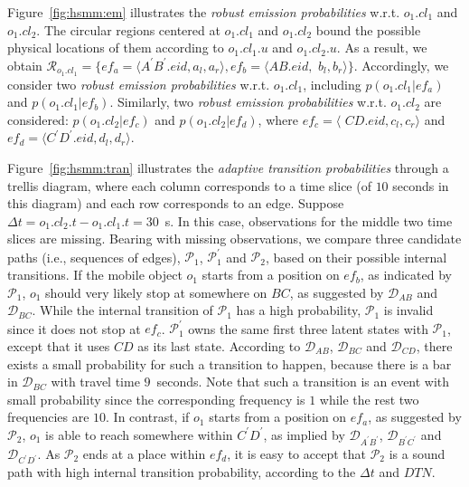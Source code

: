 \documentclass{vldb}
\begin{document}
	Figure~\ref{fig:hsmm:em} illustrates the {\em robust emission probabilities} w.r.t. $o_1.cl_1$ and $o_1.cl_2$.
	The circular regions centered at $o_1.cl_1$ and $o_1.cl_2$ bound the possible physical locations of them according to $o_1.cl_1.u$ and $o_1.cl_2.u$.
	As a result, we obtain $\mathcal{R}_{o_1.cl_1}=\{ef_a=\langle A^\prime B^\prime.eid, a_l, a_r \rangle, ef_b=\langle AB.eid,$ $b_l, b_r \rangle \}$.
	Accordingly, we consider two {\em robust emission probabilities} w.r.t. $o_1.cl_1$, including $p(o_1.cl_1|ef_a)$ and $p(o_1.cl_1|ef_b)$.
	Similarly, two {\em robust emission probabilities} w.r.t. $o_1.cl_2$ are considered: $p(o_1.cl_2|ef_c)$ and $p(o_1.cl_2|ef_d)$, where $ef_c=\langle $ $C D.eid, c_l, c_r \rangle$ and $ef_d=\langle C^\prime D^\prime.eid, d_l, d_r \rangle$.
	
	Figure~\ref{fig:hsmm:tran} illustrates the {\em adaptive transition probabilities} through a trellis diagram, where each column corresponds to a time slice (of $10$ seconds in this diagram) and each row corresponds to an edge.
	Suppose $\Delta t=o_1.cl_2.t-o_1.cl_1.t=30$~s.
	In this case, observations for the middle two time slices are missing.
	Bearing with missing observations, we compare three candidate paths (i.e., sequences of edges), $\mathcal{P}_1$, $\mathcal{P}_1^\prime$ and $\mathcal{P}_2$, based on their possible internal transitions.
	If the mobile object $o_1$ starts from a position on $ef_b$, as indicated by $\mathcal{P}_1$, $o_1$ should very likely stop at somewhere on $BC$, as suggested by $\mathcal{D}_{AB}$ and $\mathcal{D}_{BC}$.
	While the internal transition of $\mathcal{P}_1$ has a high probability, $\mathcal{P}_1$ is invalid since it does not stop at $ef_c$.
	$\mathcal{P}_1^\prime$ owns the same first three latent states with $\mathcal{P}_1$, except that it uses $CD$ as its last state.
	According to $\mathcal{D}_{AB}$, $\mathcal{D}_{BC}$ and $\mathcal{D}_{CD}$, there exists a small probability for such a transition to happen, because there is a bar in $\mathcal{D}_{BC}$ with travel time $9$~seconds.
	Note that such a transition is an event with small probability since the corresponding frequency is $1$ while the rest two frequencies are $10$. 
	In contrast, if $o_1$ starts from a position on $ef_a$, as suggested by $\mathcal{P}_2$, $o_1$ is able to reach somewhere within $C^\prime D^\prime$, as implied by $\mathcal{D}_{A^\prime B^\prime}$, $\mathcal{D}_{B^\prime C^\prime}$ and $\mathcal{D}_{C^\prime D^\prime}$.
	As $\mathcal{P}_2$ ends at a place within $ef_d$, it is easy to accept that $\mathcal{P}_2$ is a sound path with high internal transition probability, according to the $\Delta t$ and $DTN$. 
	
\end{document}
